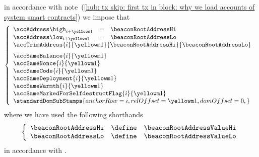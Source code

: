 \item[\underline{Loading the \inst{BEACONROOT} system smart contract:}] 
	in accordance with
	note~(\ref{hub: tx skip: first tx in block: why we load accounts of system smart contracts})
	we impose that
	\[
		\left\{ \begin{array}{lclr}
			\accAddress  \high _{i + \roffTxSkipSysiBeaconRootSystemContractAccount} & = & \beaconRootAddressHi \\
			\accAddress  \low  _{i + \roffTxSkipSysiBeaconRootSystemContractAccount} & = & \beaconRootAddressLo \\
			\multicolumn{4}{l}{
				\accTrimAddress
				{i}{\roffTxSkipSysiBeaconRootSystemContractAccount}
				{\beaconRootAddressHi}
				{\beaconRootAddressLo}} \vspace{2mm} \\
			\multicolumn{3}{l}{\accSameBalance                       {i}{\roffTxSkipSysiBeaconRootSystemContractAccount}} \\
			\multicolumn{3}{l}{\accSameNonce                         {i}{\roffTxSkipSysiBeaconRootSystemContractAccount}} \\
			\multicolumn{3}{l}{\accSameCode                          {i}{\roffTxSkipSysiBeaconRootSystemContractAccount}} \\
			\multicolumn{3}{l}{\accSameDeployment                    {i}{\roffTxSkipSysiBeaconRootSystemContractAccount}} \\
			\multicolumn{3}{l}{\accSameWarmth                        {i}{\roffTxSkipSysiBeaconRootSystemContractAccount}} \\
			\multicolumn{3}{l}{\accSameMarkedForSelfdestructFlag     {i}{\roffTxSkipSysiBeaconRootSystemContractAccount}} \\
			\multicolumn{3}{l}{
				\standardDomSubStamps {
					anchorRow = i                                              ,
					relOffset = \roffTxSkipSysiBeaconRootSystemContractAccount ,
					domOffset = 0                                              ,
				}
			} \\
		\end{array} \right.
	\]
	where we have used the following shorthands
	\[
		\left\{ \begin{array}{lcl}
			\beaconRootAddressHi & \define & \beaconRootAddressValueHi \\
			\beaconRootAddressLo & \define & \beaconRootAddressValueLo \\
		\end{array} \right.
	\]
	in accordance with \cite{EIP-4788}.
